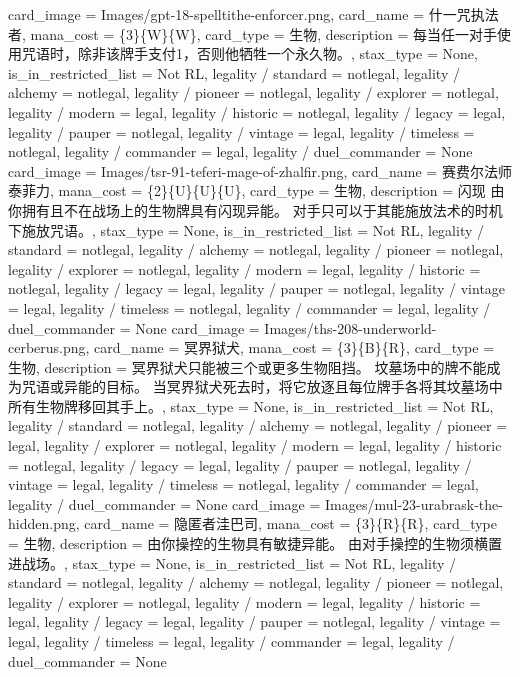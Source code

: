 \documentclass[lang = cn, color = black, 10pt]{AllThatStax}
\begin{document}
\card
{
	card_image = Images/gpt-18-spelltithe-enforcer.png,
	card_name = 什一咒执法者,
	mana_cost = \{3\}\{W\}\{W\},
	card_type = 生物,
	description = 每当任一对手使用咒语时，除非该牌手支付{1}，否则他牺牲一个永久物。,
	stax_type = None,
	is_in_restricted_list = Not RL,
	legality / standard = notlegal,
	legality / alchemy = notlegal,
	legality / pioneer = notlegal,
	legality / explorer = notlegal,
	legality / modern = legal,
	legality / historic = notlegal,
	legality / legacy = legal,
	legality / pauper = notlegal,
	legality / vintage = legal,
	legality / timeless = notlegal,
	legality / commander = legal,
	legality / duel_commander = None
}
\card
{
	card_image = Images/tsr-91-teferi-mage-of-zhalfir.png,
	card_name = 赛费尔法师泰菲力,
	mana_cost = \{2\}\{U\}\{U\}\{U\},
	card_type = 生物,
	description = 闪现
	由你拥有且不在战场上的生物牌具有闪现异能。
	对手只可以于其能施放法术的时机下施放咒语。,
	stax_type = None,
	is_in_restricted_list = Not RL,
	legality / standard = notlegal,
	legality / alchemy = notlegal,
	legality / pioneer = notlegal,
	legality / explorer = notlegal,
	legality / modern = legal,
	legality / historic = notlegal,
	legality / legacy = legal,
	legality / pauper = notlegal,
	legality / vintage = legal,
	legality / timeless = notlegal,
	legality / commander = legal,
	legality / duel_commander = None
}
\card
{
	card_image = Images/ths-208-underworld-cerberus.png,
	card_name = 冥界狱犬,
	mana_cost = \{3\}\{B\}\{R\},
	card_type = 生物,
	description = 冥界狱犬只能被三个或更多生物阻挡。
	坟墓场中的牌不能成为咒语或异能的目标。
	当冥界狱犬死去时，将它放逐且每位牌手各将其坟墓场中所有生物牌移回其手上。,
	stax_type = None,
	is_in_restricted_list = Not RL,
	legality / standard = notlegal,
	legality / alchemy = notlegal,
	legality / pioneer = legal,
	legality / explorer = notlegal,
	legality / modern = legal,
	legality / historic = notlegal,
	legality / legacy = legal,
	legality / pauper = notlegal,
	legality / vintage = legal,
	legality / timeless = notlegal,
	legality / commander = legal,
	legality / duel_commander = None
}
\card
{
	card_image = Images/mul-23-urabrask-the-hidden.png,
	card_name = 隐匿者洼巴司,
	mana_cost = \{3\}\{R\}\{R\},
	card_type = 生物,
	description = 由你操控的生物具有敏捷异能。
	由对手操控的生物须横置进战场。,
	stax_type = None,
	is_in_restricted_list = Not RL,
	legality / standard = notlegal,
	legality / alchemy = notlegal,
	legality / pioneer = notlegal,
	legality / explorer = notlegal,
	legality / modern = legal,
	legality / historic = legal,
	legality / legacy = legal,
	legality / pauper = notlegal,
	legality / vintage = legal,
	legality / timeless = legal,
	legality / commander = legal,
	legality / duel_commander = None
}
\end{document}
